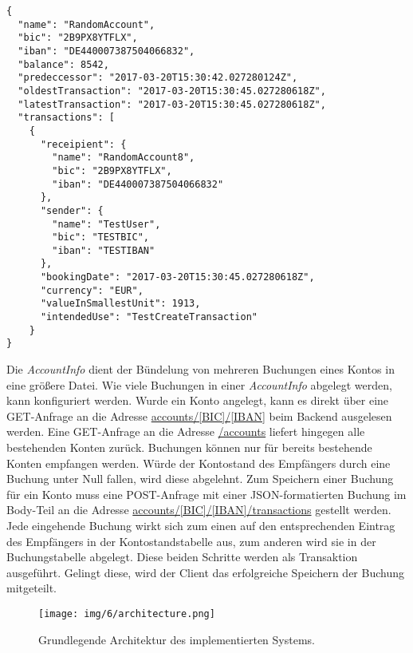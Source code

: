 \documentclass[12pt,oneside,a4paper,parskip]{scrbook}
\begin{document}
\begin{lstlisting}[label=lst:accountinfoJson,
           language={},
           firstnumber=1,
           caption=AccountInfo in JSON-Format.]           
{
  "name": "RandomAccount",
  "bic": "2B9PX8YTFLX",
  "iban": "DE440007387504066832",
  "balance": 8542,
  "predeccessor": "2017-03-20T15:30:42.027280124Z",
  "oldestTransaction": "2017-03-20T15:30:45.027280618Z",
  "latestTransaction": "2017-03-20T15:30:45.027280618Z",
  "transactions": [
    {
      "receipient": {
        "name": "RandomAccount8",
        "bic": "2B9PX8YTFLX",
        "iban": "DE440007387504066832"
      },
      "sender": {
        "name": "TestUser",
        "bic": "TESTBIC",
        "iban": "TESTIBAN"
      },
      "bookingDate": "2017-03-20T15:30:45.027280618Z",
      "currency": "EUR",
      "valueInSmallestUnit": 1913,
      "intendedUse": "TestCreateTransaction"
    }
}
\end{lstlisting}

Die \textit{AccountInfo} dient der Bündelung von mehreren Buchungen eines Kontos in eine größere Datei. Wie viele Buchungen in einer \textit{AccountInfo} abgelegt werden, kann konfiguriert werden. Wurde ein Konto angelegt, kann es direkt über eine GET-Anfrage an die Adresse \url{accounts/[BIC]/[IBAN]} beim Backend ausgelesen werden. Eine GET-Anfrage an die Adresse \url{/accounts} liefert hingegen alle bestehenden Konten zurück. Buchungen können nur für bereits bestehende Konten empfangen werden. Würde der Kontostand des Empfängers durch eine Buchung unter Null fallen, wird diese abgelehnt. Zum Speichern einer Buchung für ein Konto muss eine POST-Anfrage mit einer JSON-formatierten Buchung im Body-Teil an die Adresse \url{accounts/[BIC]/[IBAN]/transactions} gestellt werden. Jede eingehende Buchung wirkt sich zum einen auf den entsprechenden Eintrag des Empfängers in der Kontostandstabelle aus, zum anderen wird sie in der Buchungstabelle abgelegt. Diese beiden Schritte werden als Transaktion ausgeführt. Gelingt diese, wird der Client das erfolgreiche Speichern der Buchung mitgeteilt.


\begin{figure}
  \centering
  \texttt{[image: img/6/architecture.png]}
  \caption[Grundlegende Architektur des implementierten Systems]{ Grundlegende Architektur des implementierten Systems.}
  \label{architectureImpl}
\end{figure}
\end{document}
